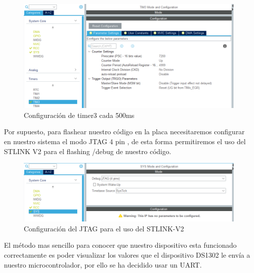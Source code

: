 \documentclass[10pt,a4paper,oneside]{article}
\begin{document}
\begin{figure}[H]
\centering
\includegraphics[scale=0.5]{Imagenes/TIMER3_CFG2.png}
\caption[Configuración de timer3 cada 500ms]{Configuración de timer3 cada 500ms}
\label{fig:005}
\end{figure}

Por supuesto, para flashear nuestro código en la placa necesitaremos configurar en nuestro sistema el modo JTAG 4 pin , de esta forma permitiremos el uso del STLINK V2 para el flashing /debug de nuestro código.

\begin{figure}[H]
\centering
\includegraphics[scale=0.5]{Imagenes/JTAG_CFG.png}
\caption[Configuración del JTAG para el uso del STLINK-V2]{Configuración del JTAG para el uso del STLINK-V2}
\label{fig:006}
\end{figure}

El método mas sencillo para conocer que nuestro dispositivo esta funcionado correctamente es poder visualizar los valores que el dispositivo DS1302 le envía a nuestro microcontrolador, por ello se ha decidido usar un UART.  
\end{document}
